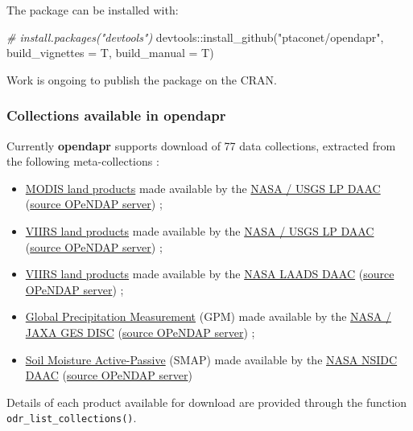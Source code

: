 \documentclass[12pt,twoside]{reedthesis}
\newenvironment{Shaded}{\begin{snugshade}}{\end{snugshade}}
\newcommand{\AttributeTok}[1]{\textcolor[rgb]{0.77,0.63,0.00}{#1}}
\newcommand{\CommentTok}[1]{\textcolor[rgb]{0.56,0.35,0.01}{\textit{#1}}}
\newcommand{\FunctionTok}[1]{\textcolor[rgb]{0.00,0.00,0.00}{#1}}
\newcommand{\NormalTok}[1]{#1}
\newcommand{\SpecialCharTok}[1]{\textcolor[rgb]{0.00,0.00,0.00}{#1}}
\newcommand{\StringTok}[1]{\textcolor[rgb]{0.31,0.60,0.02}{#1}}
\providecommand{\tightlist}{%
  \setlength{\itemsep}{0pt}\setlength{\parskip}{0pt}}
\begin{document}
The package can be installed with:
\begin{Shaded}
\begin{Highlighting}[]
\CommentTok{\# install.packages("devtools")}
\NormalTok{devtools}\SpecialCharTok{::}\FunctionTok{install\_github}\NormalTok{(}\StringTok{"ptaconet/opendapr"}\NormalTok{, }\AttributeTok{build\_vignettes =}\NormalTok{ T, }\AttributeTok{build\_manual =}\NormalTok{ T)}
\end{Highlighting}
\end{Shaded}
Work is ongoing to publish the package on the CRAN.

\hypertarget{coll-available}{%
\subsubsection{Collections available in opendapr}\label{coll-available}}

Currently \textbf{opendapr} supports download of 77 data collections, extracted from the following meta-collections :
\begin{itemize}
\tightlist
\item
  \href{https://lpdaac.usgs.gov/data/get-started-data/collection-overview/missions/modis-overview/}{MODIS land products} made available by the \href{https://lpdaac.usgs.gov/}{NASA / USGS LP DAAC} (\href{https://opendap.cr.usgs.gov/opendap/hyrax/}{source OPeNDAP server}) ;
\item
  \href{https://lpdaac.usgs.gov/data/get-started-data/collection-overview/missions/s-npp-nasa-viirs-overview/}{VIIRS land products} made available by the \href{https://lpdaac.usgs.gov/}{NASA / USGS LP DAAC} (\href{https://opendap.cr.usgs.gov/opendap/hyrax/}{source OPeNDAP server}) ;
\item
  \href{https://lpdaac.usgs.gov/data/get-started-data/collection-overview/missions/s-npp-nasa-viirs-overview/}{VIIRS land products} made available by the \href{https://lpdaac.usgs.gov/}{NASA LAADS DAAC} (\href{https://ladsweb.modaps.eosdis.nasa.gov/opendap/hyrax/allData/5000/}{source OPeNDAP server}) ;
\item
  \href{https://pmm.nasa.gov/GPM}{Global Precipitation Measurement} (GPM) made available by the \href{https://disc.gsfc.nasa.gov/}{NASA / JAXA GES DISC} (\href{https://gpm1.gesdisc.eosdis.nasa.gov/opendap/GPM_L3}{source OPeNDAP server}) ;
\item
  \href{https://smap.jpl.nasa.gov/}{Soil Moisture Active-Passive} (SMAP) made available by the \href{https://nsidc.org/}{NASA NSIDC DAAC} (\href{https://n5eil02u.ecs.nsidc.org/opendap/SMAP/}{source OPeNDAP server})
\end{itemize}
Details of each product available for download are provided through the function \texttt{odr\_list\_collections()}.
\end{document}
